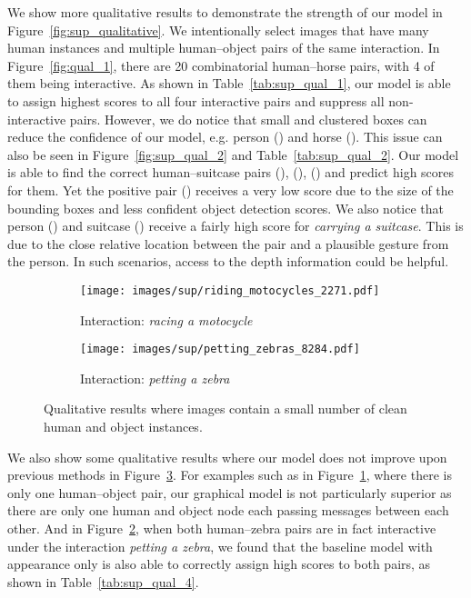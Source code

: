 \documentclass[10pt,twocolumn,letterpaper]{article}
\begin{document}
 We show more qualitative results to demonstrate the strength of our model in Figure~\ref{fig:sup_qualitative}. We intentionally select images that have many human instances and multiple human--object pairs of the same interaction. In Figure~\ref{fig:qual_1}, there are 20 combinatorial human--horse pairs, with 4 of them being interactive. As shown in Table~\ref{tab:sup_qual_1}, our model is able to assign highest scores to all four interactive pairs and suppress all non-interactive pairs. However, we do notice that small and clustered boxes can reduce the confidence of our model, e.g. person () and horse (). This issue can also be seen in Figure~\ref{fig:sup_qual_2} and Table~\ref{tab:sup_qual_2}. Our model is able to find the correct human--suitcase pairs (), (), () and predict high scores for them. Yet the positive pair () receives a very low score due to the size of the bounding boxes and less confident object detection scores. We also notice that person () and suitcase () receive a fairly high score for \textit{carrying a suitcase}. This is due to the close relative location between the pair and a plausible gesture from the person. In such scenarios, access to the depth information could be helpful.

 \begin{figure}[h!]\centering
	\begin{subfigure}[t]{.49\linewidth}
	   \centering
		\texttt{[image: images/sup/riding\_motocycles\_2271.pdf]}\caption{Interaction: \textit{racing a motocycle}}
	   \label{fig:sup_qual_3}
	\end{subfigure}
	\begin{subfigure}[t]{.49\linewidth}
		\centering
		 \texttt{[image: images/sup/petting\_zebras\_8284.pdf]}\caption{Interaction: \textit{petting a zebra}}
		\label{fig:sup_qual_4}
	 \end{subfigure}
	 \newline
	 \caption{Qualitative results where images contain a small number of clean human and object instances.}
	 \label{fig:sup_qualitative_2}
 \end{figure}

 We also show some qualitative results where our model does not improve upon previous methods in Figure~\ref{fig:sup_qualitative_2}. For examples such as in Figure~\ref{fig:sup_qual_3}, where there is only one human--object pair, our graphical model is not particularly superior as there are only one human and object node each passing messages between each other. And in Figure~\ref{fig:sup_qual_4}, when both human--zebra pairs are in fact interactive under the interaction \textit{petting a zebra}, we found that the baseline model with appearance only is also able to correctly assign high scores to both pairs, as shown in Table~\ref{tab:sup_qual_4}.
\end{document}
